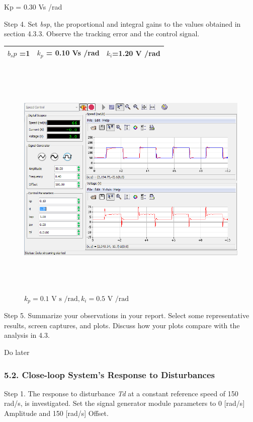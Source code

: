 \documentclass[]{article}
\begin{document}
Kp = 0.30 Vs /rad

Step 4. Set \emph{bsp}, the proportional and integral gains to the
values obtained in section 4.3.3. Observe the tracking error and the
control signal.

\begin{longtable}[]{@{}lll@{}}
\toprule
$b_sp$ =1 & $k_p$ = 0.10 Vs /rad & $k_i$=1.20 V /rad\tabularnewline
\bottomrule
\end{longtable}

\begin{figure}\includegraphics[width=6.50000in,height=4.62500in]{media/image35.png} \caption{$k_p = \text{0.1 V s /rad}, k_i = \text{0.5 V /rad}$} \end{figure}

Step 5. Summarize your observations in your report. Select some
representative results, screen captures, and plots. Discuss how your
plots compare with the analysis in 4.3.

Do later

\subsubsection{5.2. Close-loop System's Response to
Disturbances}\label{close-loop-systems-response-to-disturbances}

Step 1. The response to disturbance \emph{Td} at a constant reference
speed of 150 rad/s, is investigated. Set the signal generator module
parameters to 0 {[}rad/s{]} Amplitude and 150 {[}rad/s{]} Offset.
\end{document}
